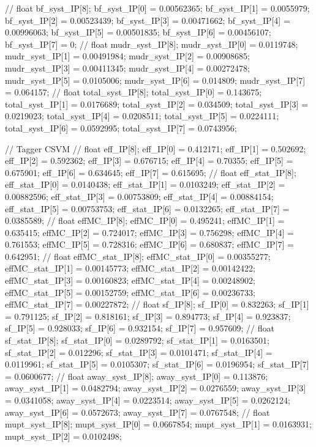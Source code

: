// float bf_syst_IP[8];
bf_syst_IP[0] = 0.00562365; bf_syst_IP[1] = 0.0055979; bf_syst_IP[2] = 0.00523439; 
bf_syst_IP[3] = 0.00471662; bf_syst_IP[4] = 0.00996063; bf_syst_IP[5] = 0.00501835; 
bf_syst_IP[6] = 0.00456107; bf_syst_IP[7] = 0; 
// float mudr_syst_IP[8];
mudr_syst_IP[0] = 0.0119748; mudr_syst_IP[1] = 0.00491984; mudr_syst_IP[2] = 0.00908685; 
mudr_syst_IP[3] = 0.00411345; mudr_syst_IP[4] = 0.00272478; mudr_syst_IP[5] = 0.0105006; 
mudr_syst_IP[6] = 0.014809; mudr_syst_IP[7] = 0.064157; 
// float total_syst_IP[8];
total_syst_IP[0] = 0.143675; total_syst_IP[1] = 0.0176689; total_syst_IP[2] = 0.034509; 
total_syst_IP[3] = 0.0219023; total_syst_IP[4] = 0.0208511; total_syst_IP[5] = 0.0224111; 
total_syst_IP[6] = 0.0592995; total_syst_IP[7] = 0.0743956; 



// Tagger CSVM
// float eff_IP[8];
eff_IP[0] = 0.412171; eff_IP[1] = 0.502692; eff_IP[2] = 0.592362; 
eff_IP[3] = 0.676715; eff_IP[4] = 0.70355; eff_IP[5] = 0.675901; 
eff_IP[6] = 0.634645; eff_IP[7] = 0.615695; 
// float eff_stat_IP[8];
eff_stat_IP[0] = 0.0140438; eff_stat_IP[1] = 0.0103249; eff_stat_IP[2] = 0.00882596; 
eff_stat_IP[3] = 0.00753809; eff_stat_IP[4] = 0.00884154; eff_stat_IP[5] = 0.00753753; 
eff_stat_IP[6] = 0.0132265; eff_stat_IP[7] = 0.0385589; 
// float effMC_IP[8];
effMC_IP[0] = 0.495241; effMC_IP[1] = 0.635415; effMC_IP[2] = 0.724017; 
effMC_IP[3] = 0.756298; effMC_IP[4] = 0.761553; effMC_IP[5] = 0.728316; 
effMC_IP[6] = 0.680837; effMC_IP[7] = 0.642951; 
// float effMC_stat_IP[8];
effMC_stat_IP[0] = 0.00355277; effMC_stat_IP[1] = 0.00145773; effMC_stat_IP[2] = 0.00142422; 
effMC_stat_IP[3] = 0.00160823; effMC_stat_IP[4] = 0.00248902; effMC_stat_IP[5] = 0.00152759; 
effMC_stat_IP[6] = 0.00236733; effMC_stat_IP[7] = 0.00227872; 
// float sf_IP[8];
sf_IP[0] = 0.832263; sf_IP[1] = 0.791125; sf_IP[2] = 0.818161; 
sf_IP[3] = 0.894773; sf_IP[4] = 0.923837; sf_IP[5] = 0.928033; 
sf_IP[6] = 0.932154; sf_IP[7] = 0.957609; 
// float sf_stat_IP[8];
sf_stat_IP[0] = 0.0289792; sf_stat_IP[1] = 0.0163501; sf_stat_IP[2] = 0.012296; 
sf_stat_IP[3] = 0.0101471; sf_stat_IP[4] = 0.0119961; sf_stat_IP[5] = 0.0105307; 
sf_stat_IP[6] = 0.0196954; sf_stat_IP[7] = 0.0600677; 
// float away_syst_IP[8];
away_syst_IP[0] = 0.113876; away_syst_IP[1] = 0.0482794; away_syst_IP[2] = 0.0276559; 
away_syst_IP[3] = 0.0341058; away_syst_IP[4] = 0.0223514; away_syst_IP[5] = 0.0262124; 
away_syst_IP[6] = 0.0572673; away_syst_IP[7] = 0.0767548; 
// float mupt_syst_IP[8];
mupt_syst_IP[0] = 0.0667854; mupt_syst_IP[1] = 0.0163931; mupt_syst_IP[2] = 0.0102498; 
